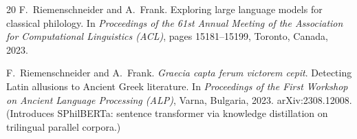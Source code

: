 \documentclass[12pt,letterpaper]{article}
\begin{document}
\begin{thebibliography}{20}
F.~Riemenschneider and A.~Frank.
\newblock Exploring large language models for classical philology.
\newblock In \emph{Proceedings of the 61st Annual Meeting of the Association
  for Computational Linguistics (ACL)}, pages 15181--15199,
  Toronto, Canada, 2023.

F.~Riemenschneider and A.~Frank.
\newblock \emph{Graecia capta ferum victorem cepit}.
  {D}etecting {L}atin allusions to {A}ncient {G}reek literature.
\newblock In \emph{Proceedings of the First Workshop on Ancient Language
  Processing (ALP)}, Varna, Bulgaria, 2023.
\newblock arXiv:2308.12008.
\newblock (Introduces SPhilBERTa: sentence transformer via knowledge
  distillation on trilingual parallel corpora.)

\end{thebibliography}
\end{document}
